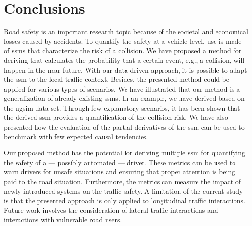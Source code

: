 \section{Conclusions}
\label{sec:conclusions}

Road safety is an important research topic because of the societal and economical losses caused by accidents.
To quantify the safety at a vehicle level, use is made of \acp{ssm} that characterize the risk of a collision. 
We have proposed a method for deriving  that calculates the probability that a certain event, e.g., a collision, will happen in the near future.
With our data-driven approach, it is possible to adapt the \ac{ssm} to the local traffic context.
Besides, the presented method could be applied for various types of scenarios.
We have illustrated that our method is a generalization of already existing \acp{ssm}.
In an example, we have derived  based on the \ac{ngsim} data set.
Through few explanatory scenarios, it has been shown that the derived \ac{ssm} provides a quantification of the collision risk.
We have also presented how the evaluation of the partial derivatives of the \ac{ssm} can be used to benchmark  with few expected causal tendencies.

Our proposed method has the potential for deriving multiple \ac{ssm} for quantifying the safety of a --- possibly automated --- driver.
These metrics can be used to warn drivers for unsafe situations and ensuring that proper attention is being paid to the road situation.
Furthermore, the metrics can measure the impact of newly introduced systems on the traffic safety.
A limitation of the current study is that the presented approach is only applied to longitudinal traffic interactions. 
Future work involves the consideration of lateral traffic interactions and interactions with vulnerable road users. 
